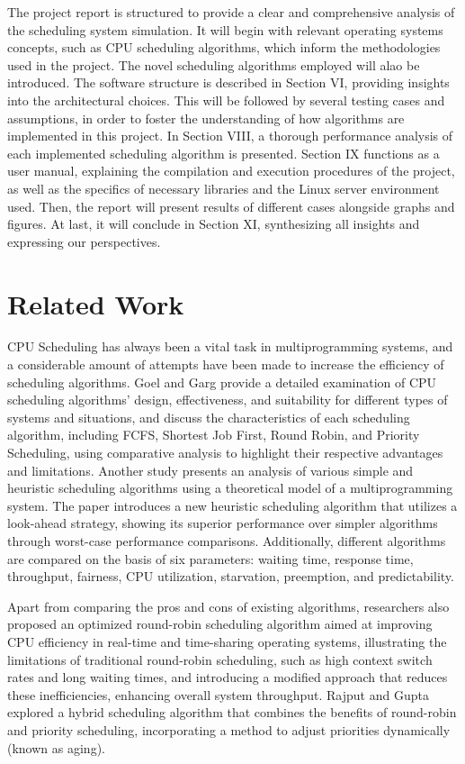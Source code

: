 \documentclass[conference]{IEEEtran}
\begin{document}
The project report is structured to provide a clear and comprehensive analysis of the scheduling system simulation. It will begin with relevant operating systems concepts, such as CPU scheduling algorithms, which inform the methodologies used in the project. The novel scheduling algorithms employed will alao be introduced. The software structure is described in Section VI, providing insights into the architectural choices. This will be followed by several testing cases and assumptions, in order to foster the understanding of how algorithms are implemented in this project. In Section VIII, a thorough performance analysis of each implemented scheduling algorithm is presented. Section IX functions as a user manual, explaining the compilation and execution procedures of the project, as well as the specifics of necessary libraries and the Linux server environment used. Then, the report will present results of different cases alongside graphs and figures. At last, it will conclude in Section XI, synthesizing all insights and expressing our perspectives.

\section{\textbf{Related Work}}
CPU Scheduling has always been a vital task in multiprogramming systems, and a considerable amount of attempts have been made to increase the efficiency of scheduling algorithms. Goel and Garg\cite{goel2013comparative} provide a detailed examination of CPU scheduling algorithms' design, effectiveness, and suitability for different types of systems and situations, and discuss the characteristics of each scheduling algorithm, including FCFS, Shortest Job First, Round Robin, and Priority Scheduling, using comparative analysis to highlight their respective advantages and limitations. Another study\cite{krause1975analysis} presents an analysis of various simple and heuristic scheduling algorithms using a theoretical model of a multiprogramming system. The paper introduces a new heuristic scheduling algorithm that utilizes a look-ahead strategy, showing its superior performance over simpler algorithms through worst-case performance comparisons. Additionally, different algorithms are compared on the basis of six parameters: waiting time, response time, throughput, fairness, CPU utilization, starvation, preemption, and predictability\cite{adekunle2014comparative}. 

Apart from comparing the pros and cons of existing algorithms, researchers also proposed an optimized round-robin scheduling algorithm aimed at improving CPU efficiency in real-time and time-sharing operating systems, illustrating the limitations of traditional round-robin scheduling, such as high context switch rates and long waiting times, and introducing a modified approach that reduces these inefficiencies, enhancing overall system throughput\cite{singh2010optimized}. Rajput and Gupta\cite{rajput2012priority} explored a hybrid scheduling algorithm that combines the benefits of round-robin and priority scheduling, incorporating a method to adjust priorities dynamically (known as aging). 
\end{document}
